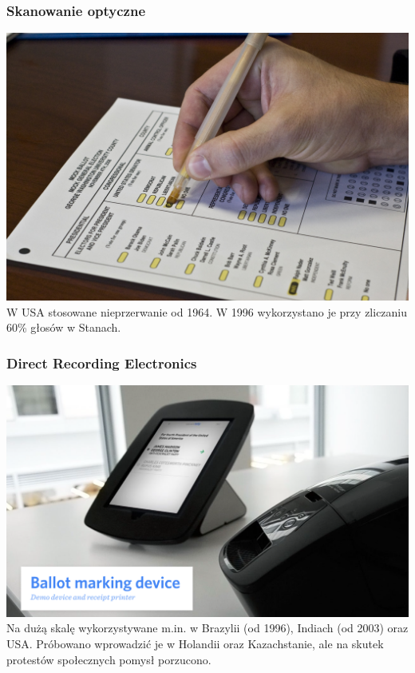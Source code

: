\documentclass{beamer}
\begin{document}
\begin{frame}
\frametitle{Skanowanie optyczne}
\includegraphics[height=0.7\paperheight, center]{optical} \\ \pause
W USA stosowane nieprzerwanie od 1964. \pause W 1996 wykorzystano je przy zliczaniu 60\% głosów w Stanach.
\end{frame}

\begin{frame}
\frametitle{Direct Recording Electronics}
\includegraphics[height=0.65\paperheight, center]{dre} \\ \pause
Na dużą skalę wykorzystywane m.in. w Brazylii (od 1996), Indiach (od 2003) oraz USA. \pause Próbowano wprowadzić je w Holandii oraz Kazachstanie, ale na skutek protestów społecznych pomysł porzucono.
\end{frame}
\end{document}

